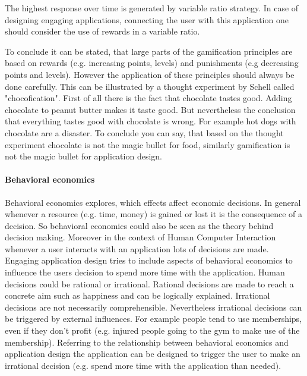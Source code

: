 The highest response over time is generated by variable ratio strategy. In case of designing engaging applications, connecting the user with this application one should consider the use of rewards in a variable ratio. \cite[p. 11]{lewisIrresistibleAppsMotivational2014}

To conclude it can be stated, that large parts of the gamification principles are based on rewards (e.g. increasing points, levels) and punishments (e.g decreasing points and levels). However the application of these principles should always be done carefully. This can be illustrated by a thought experiment by Schell called "chocofication". First of all there is the fact that chocolate tastes good. Adding chocolate to peanut butter makes it taste good. But nevertheless the conclusion that everything tastes good with chocolate is wrong. For example hot dogs with chocolate are a disaster. 
To conclude you can say, that based on the thought experiment chocolate is not the magic bullet for food, similarly gamification is not the magic bullet for application design. \cite[p. 12]{lewisIrresistibleAppsMotivational2014}


\paragraph*{Behavioral economics}

Behavioral economics explores, which effects affect economic decisions. In general whenever a resource (e.g. time, money) is gained or lost it is the consequence of a decision. So behavioral economics could also be seen as the theory behind decision making. Moreover in the context of Human Computer Interaction whenever a user interacts with an application lots of decisions are made. Engaging application design tries to include aspects of behavioral economics to influence the users decision to spend more time with the application. 
Human decisions could be rational or irrational. Rational decisions are made to reach a concrete aim such as happiness and can be logically explained. Irrational decisions are not necessarily comprehensible. Nevertheless irrational decisions can be triggered by external influences. For example people tend to use memberships, even if they don't profit (e.g. injured people going to the gym to make use of the membership).
Referring to the relationship between behavioral economics and application design the application can be designed to trigger the user to make an irrational decision (e.g. spend more time with the application than needed). \cite[p. 19]{lewisIrresistibleAppsMotivational2014}



